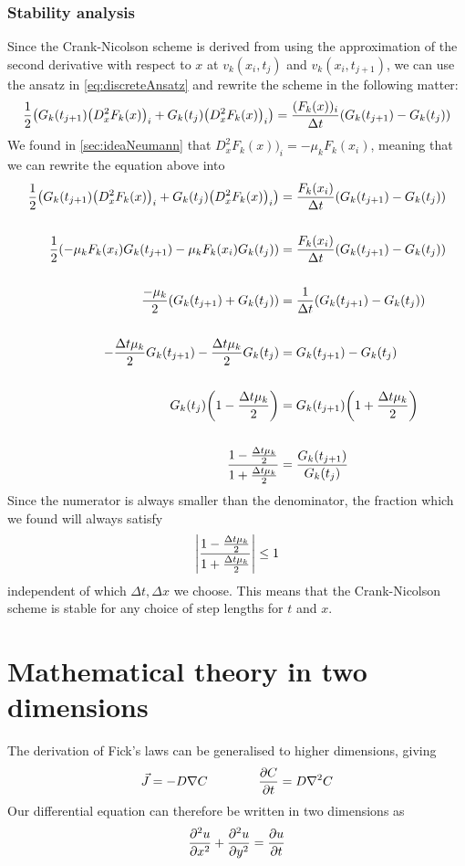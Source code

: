 \documentclass[12pt,english,a4paper]{article}
\begin{document}
\subsubsection{Stability analysis}
Since the Crank-Nicolson scheme is derived from using the approximation of the second derivative with respect to \(x\) at \(v_k(x_i,t_j)\) and \(v_k(x_i,t_{j+1})\), we can use the ansatz in \vref{eq:discreteAnsatz} and rewrite the scheme in the following matter:
\[
\frac{1}{2}\qty(G_k(t_{j+1})\qty(D_x^2F_k(x) )_i +  G_k(t_j)\qty(D_x^2F_k(x))_i ) = \frac{(F_k(x) )_i }{\Delta t}\qty(G_k(t_{j+1}) - G_k(t_j) )
\]
We found in \vref{sec:ideaNeumann} that \(D_x^2F_k(x))_i = -\mu_kF_k(x_i)\), meaning that we can rewrite the equation above into
\begin{align*}
\frac{1}{2}\qty(G_k(t_{j+1})\qty(D_x^2F_k(x) )_i +  G_k(t_j)\qty(D_x^2F_k(x))_i ) &= \frac{F_k(x_i) }{\Delta t}\qty(G_k(t_{j+1}) - G_k(t_j) ) \\ \hfill \\
\frac{1}{2}\qty(-\mu_kF_k(x_i)G_k(t_{j+1}) -\mu_kF_k(x_i)G_k(t_j))&= \frac{F_k(x_i)}{\Delta t}\qty(G_k(t_{j+1}) - G_k(t_j) )  \\\hfill \\
\frac{-\mu_k}{2}\qty(G_k(t_{j+1}) +G_k(t_j))&= \frac{1}{\Delta t}\qty(G_k(t_{j+1}) - G_k(t_j) )  \\\hfill \\
-\frac{\Delta t\mu_k}{2}G_k(t_{j+1}) -\frac{\Delta t\mu_k}{2} G_k(t_j)&= G_k(t_{j+1}) - G_k(t_j)   \\\hfill \\
G_k(t_j)\qty(1-\frac{\Delta t\mu_k}{2})&= G_k(t_{j+1})\qty(1+\frac{\Delta t\mu_k}{2} )    \\\hfill \\
\frac{1-\frac{\Delta t\mu_k}{2}}{1+\frac{\Delta t\mu_k}{2}}&= \frac{G_k(t_{j+1}) }{G_k(t_j)}
\end{align*}
Since the numerator is always smaller than the denominator, the fraction which we found will always satisfy
\[
\abs{\frac{1-\frac{\Delta t\mu_k}{2}}{1+\frac{\Delta t\mu_k}{2}}} \leq 1
\]
independent of which \( \Delta t, \Delta x\) we choose. This means that the Crank-Nicolson scheme is stable for any choice of step lengths for \(t\) and \(x\).



\section{Mathematical theory in two dimensions}
The derivation of Fick's laws can be generalised to higher dimensions, giving
\[
    \vec{J} = -D\nabla C \qquad\qquad \pdv{C}{t} = D\nabla^2C
\]
Our differential equation can therefore be written in two dimensions as
\begin{equation} \label{eq:twoDim}
\pdv[2]{u}{x} + \pdv[2]{u}{y} = \pdv{u}{t}
\end{equation}
\end{document}
